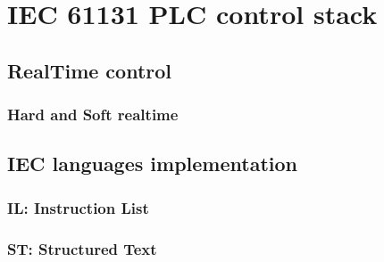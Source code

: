\part{IEC 61131 PLC control stack}

\chapter{RealTime control}\label{RT}

\section{Hard and Soft realtime}

\chapter{IEC languages implementation}

\section{IL: Instruction List}

\section{ST: Structured Text}
